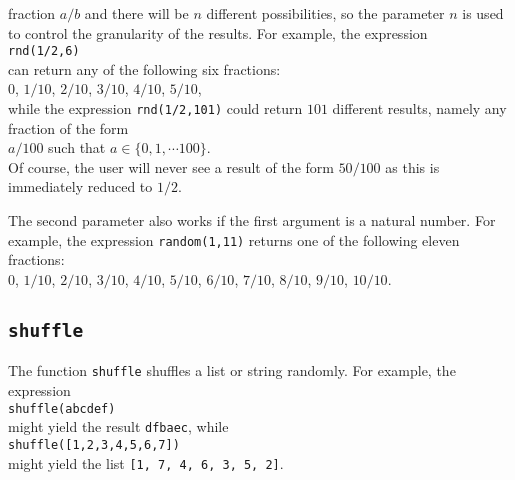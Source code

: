 \begin{enumerate}
      fraction $a/b$ and there will be $n$ different possibilities, so the parameter $n$ is used to
      control the granularity of the results.  For example,  the expression 
      \\[0.2cm]
      \hspace*{1.3cm}
      \texttt{rnd(1/2,6)}
      \\[0.2cm]
      can return any of the following six fractions:
      \\[0.2cm]
      \hspace*{1.3cm}
      $0$, $1/10$, $2/10$, $3/10$, $4/10$, $5/10$,
      \\[0.2cm]
      while the expression \texttt{rnd(1/2,101)} could return $101$ different results, namely any
      fraction of the form
      \\[0.2cm]
      \hspace*{1.3cm}
      $a/100$ \quad such that $a \in \{0, 1, \cdots 100\}$.
      \\[0.2cm]
      Of course, the user will never see a result of the form $50/100$ as this is immediately
      reduced to $1/2$. 

      The second parameter also works if the first argument is a natural number.  For example, the
      expression \texttt{random(1,11)} returns one of the following eleven fractions:
      \\[0.2cm]
      \hspace*{1.3cm}
      $0$, $1/10$, $2/10$, $3/10$, $4/10$, $5/10$,
      $6/10$, $7/10$, $8/10$, $9/10$, $10/10$.      
\end{enumerate}

\subsection{\texttt{shuffle}}
The function \texttt{shuffle} shuffles a list or string
randomly.  For example, the expression
\\[0.2cm]
\hspace*{1.3cm}
\texttt{shuffle(abcdef)}
\\[0.2cm]
might yield the result \texttt{dfbaec}, while 
\\[0.2cm]
\hspace*{1.3cm}
\texttt{shuffle([1,2,3,4,5,6,7])}
\\[0.2cm]
might yield the list \texttt{[1, 7, 4, 6, 3, 5, 2]}.

